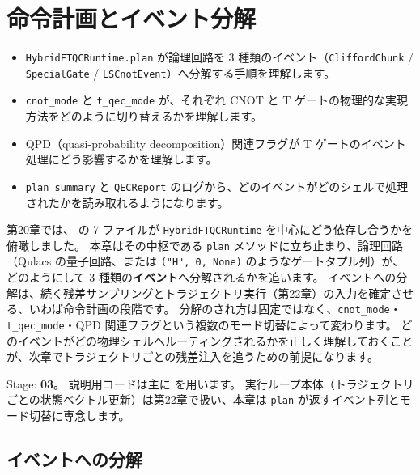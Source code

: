 \chapter{命令計画とイベント分解}\label{ch:plan}

\begin{chaptergoal}
  \begin{itemize}
  \item \texttt{HybridFTQCRuntime.plan} が論理回路を 3 種類のイベント（\texttt{CliffordChunk} / \texttt{SpecialGate} / \texttt{LSCnotEvent}）へ分解する手順を理解します。
  \item \texttt{cnot\_mode} と \texttt{t\_qec\_mode} が、それぞれ CNOT と T ゲートの物理的な実現方法をどのように切り替えるかを理解します。
  \item QPD（quasi-probability decomposition）関連フラグが T ゲートのイベント処理にどう影響するかを理解します。
  \item \texttt{plan\_summary} と \texttt{QECReport} のログから、どのイベントがどのシェルで処理されたかを読み取れるようになります。
  \end{itemize}
\end{chaptergoal}

第20章では、 の 7 ファイルが \texttt{HybridFTQCRuntime} を中心にどう依存し合うかを俯瞰しました。
本章はその中枢である \texttt{plan} メソッドに立ち止まり、論理回路（Qulacs の量子回路、または \texttt{("H", 0, None)} のようなゲートタプル列）が、どのようにして 3 種類の\textbf{イベント}へ分解されるかを追います。
イベントへの分解は、続く残差サンプリングとトラジェクトリ実行（第22章）の入力を確定させる、いわば命令計画の段階です。
分解のされ方は固定ではなく、\texttt{cnot\_mode}・\texttt{t\_qec\_mode}・QPD 関連フラグという複数のモード切替によって変わります。
どのイベントがどの物理シェルへルーティングされるかを正しく理解しておくことが、次章でトラジェクトリごとの残差注入を追うための前提になります。

\begin{notebox}
  Stage: \textbf{03}。
  説明用コードは主に  を用います。
  実行ループ本体（トラジェクトリごとの状態ベクトル更新）は第22章で扱い、本章は \texttt{plan} が返すイベント列とモード切替に専念します。
\end{notebox}

\section{イベントへの分解}\label{sec:plan_events}

